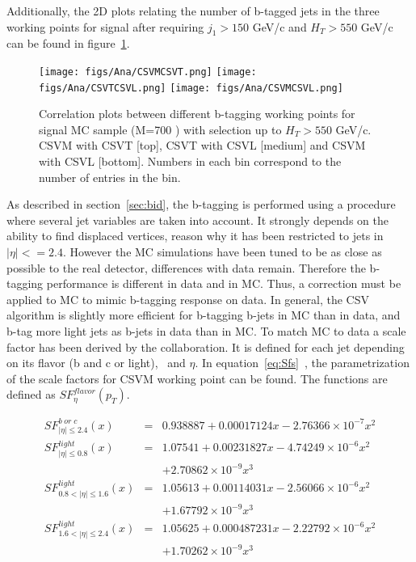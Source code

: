Additionally, the 2D plots relating the number of b-tagged jets in the three working points for signal after requiring $j_{1}>150$ GeV/c and $H_{T}>550$ GeV/c can be found in figure~\ref{fig:WPcorr}.

\begin{figure}[!Hhtbp]
  \begin{center}
    \texttt{[image: figs/Ana/CSVMCSVT.png]}
    \texttt{[image: figs/Ana/CSVTCSVL.png]}
    \texttt{[image: figs/Ana/CSVMCSVL.png]}
    \caption{Correlation plots between different b-tagging working points for signal MC sample (M=700 \GeVcc) with selection up to $H_{T}>550$ GeV/c. CSVM with CSVT [top], CSVT with CSVL [medium] and CSVM with CSVL [bottom]. Numbers in each bin correspond to the number of entries in the bin.}
    \label{fig:WPcorr}
  \end{center}
\end{figure}

As described in section~\ref{sec:bid}, the b-tagging is performed using a procedure where several jet variables are taken into account. It strongly depends on the ability to find displaced vertices, reason why it has been restricted to jets in $|\eta|<=2.4$. However the MC simulations have been tuned to be as close as possible to the real detector, differences with data remain. Therefore the b-tagging performance is different in data and in MC. Thus, a correction must be applied to MC to mimic b-tagging response on data. In general, the CSV algorithm is slightly more efficient for b-tagging b-jets in MC than in data, and b-tag more light jets as b-jets in data than in MC. To match MC to data a scale factor has been derived by the collaboration. It is defined for each jet depending on its flavor (b and c or light), \pt~and $\eta$. In equation~\ref{eq:Sfs}~\cite{CMS:2013vea}, the parametrization of the scale factors for CSVM working point can be found. The functions are defined as $SF^{flavor}_{\eta}(p_{T})$.

\begin{eqnarray}
  \label{eq:Sfs}
  SF^{b\; or\; c}_{|\eta|\le 2.4}(x) & = & 0.938887 + 0.00017124x - 2.76366 \times 10^{-7}x^{2} \nonumber \\
  SF^{light}_{|\eta|\le 0.8}(x) & = & 1.07541 + 0.00231827x - 4.74249 \times 10^{-6}x^{2}  \nonumber \\
  &  & +2.70862 \times 10^{-9}x^{3} \nonumber \\
  SF^{light}_{0.8 < |\eta|\le 1.6}(x) & = & 1.05613 + 0.00114031x - 2.56066 \times 10^{-6}x^{2} \nonumber \\
  &  & + 1.67792 \times 10^{-9}x^{3} \nonumber \\
  SF^{light}_{1.6 < |\eta|\le 2.4}(x) & = & 1.05625 + 0.000487231x - 2.22792 \times 10^{-6}x^{2} \nonumber \\
  &  & + 1.70262 \times 10^{-9}x^{3}
\end{eqnarray}

